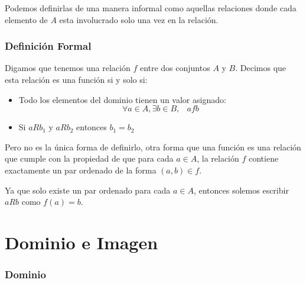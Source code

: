\documentclass[12pt]{report}                                    %
\DeclareMathOperator \Space {\quad}                             %
\DeclareMathOperator \MiniSpace {\;}                            %
\begin{document}
            Podemos definirlas de una manera informal como aquellas relaciones donde cada elemento de $A$ 
            esta involucrado solo una vez en la relación.

            \subsubsection*{Definición Formal}

            Digamos que tenemos una relación $f$ entre dos conjuntos $A$ y $B$.
            Decimos que esta relación es una función si y solo si:

            \begin{itemize}
                \item Todo los elementos del dominio tienen un valor asignado:
                    \begin{equation}
                        \forall a \in A, \exists b \in B, \MiniSpace afb
                    \end{equation}

                \item Si $aRb_1$ y $aRb_2$ entonces $b_1 = b_2$

            \end{itemize}

            Pero no es la única forma de definirlo, otra forma que una función es una relación que 
            cumple con la propiedad de que para cada $a \in A$, la relación $f$ contiene exactamente
            un par ordenado de la forma $(a,b) \in f$.

            Ya que solo existe un par ordenado para cada $a \in A$, entonces solemos escribir 
            $aRb$ como $f(a) = b$.







        \clearpage
        \section{Dominio e Imagen}
            
            \subsubsection*{Dominio}
\end{document}
